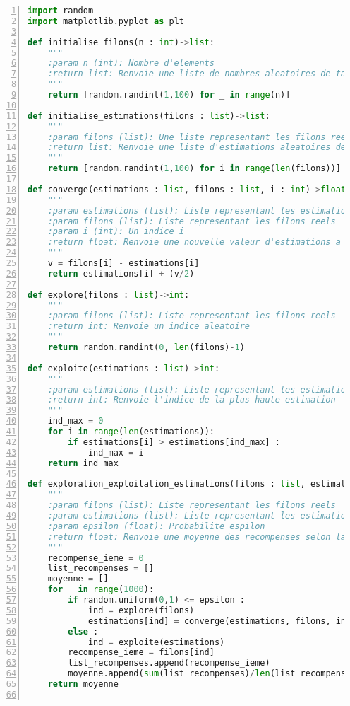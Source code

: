 \documentclass[
12pt,
french,
]{article}
\begin{document}
\begin{lstlisting}[language=Python, numbers=left, label=exploration_exploitation_estimations]
import random
import matplotlib.pyplot as plt

def initialise_filons(n : int)->list:
    """
    :param n (int): Nombre d'elements
    :return list: Renvoie une liste de nombres aleatoires de taille n
    """
    return [random.randint(1,100) for _ in range(n)]

def initialise_estimations(filons : list)->list:
    """
    :param filons (list): Une liste representant les filons reels
    :return list: Renvoie une liste d'estimations aleatoires des filons reels
    """
    return [random.randint(1,100) for i in range(len(filons))]

def converge(estimations : list, filons : list, i : int)->float:
    """
    :param estimations (list): Liste representant les estimations des filons
    :param filons (list): Liste representant les filons reels
    :param i (int): Un indice i
    :return float: Renvoie une nouvelle valeur d'estimations a l'indice i qui converge vers la valeur reelle du filon 
    """
    v = filons[i] - estimations[i]
    return estimations[i] + (v/2)

def explore(filons : list)->int:
    """
    :param filons (list): Liste representant les filons reels
    :return int: Renvoie un indice aleatoire
    """
    return random.randint(0, len(filons)-1)

def exploite(estimations : list)->int:
    """
    :param estimations (list): Liste representant les estimations
    :return int: Renvoie l'indice de la plus haute estimation
    """
    ind_max = 0
    for i in range(len(estimations)):
        if estimations[i] > estimations[ind_max] :
            ind_max = i
    return ind_max

def exploration_exploitation_estimations(filons : list, estimations : list, epsilon : float)->float:
    """
    :param filons (list): Liste representant les filons reels
    :param estimations (list): Liste representant les estimations
    :param epsilon (float): Probabilite espilon
    :return float: Renvoie une moyenne des recompenses selon la methode d'estimation d'actions
    """
    recompense_ieme = 0
    list_recompenses = []
    moyenne = []
    for _ in range(1000):
        if random.uniform(0,1) <= epsilon :
            ind = explore(filons)
            estimations[ind] = converge(estimations, filons, ind)
        else :
            ind = exploite(estimations)
        recompense_ieme = filons[ind]
        list_recompenses.append(recompense_ieme)
        moyenne.append(sum(list_recompenses)/len(list_recompenses))
    return moyenne


\end{lstlisting}
\end{document}
